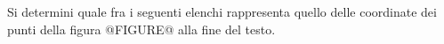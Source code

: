 Si determini quale fra i seguenti elenchi rappresenta quello delle coordinate dei punti della figura 
@FIGURE@ alla fine del testo.